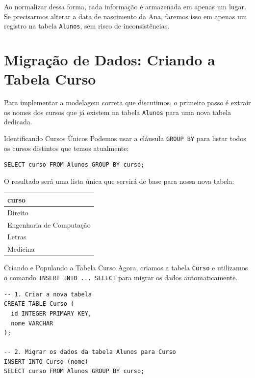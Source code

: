 \documentclass[12pt]{article}
\begin{document}
\begin{atencao}
Ao normalizar dessa forma, cada informação é armazenada em apenas um lugar. Se precisarmos alterar a data de nascimento da Ana, faremos isso em apenas um registro na tabela \texttt{Alunos}, sem risco de inconsistências.
\end{atencao}
\section{Migração de Dados: Criando a Tabela Curso}

Para implementar a modelagem correta que discutimos, o primeiro passo é extrair os nomes dos cursos que já existem na tabela \texttt{Alunos} para uma nova tabela dedicada.

\begin{block}{Identificando Cursos Únicos}
Podemos usar a cláusula \texttt{GROUP BY} para listar todos os cursos distintos que temos atualmente:

\begin{lstlisting}
SELECT curso FROM Alunos GROUP BY curso;
\end{lstlisting}

O resultado será uma lista única que servirá de base para nossa nova tabela:

\begin{center}
{\tiny
\begin{tabular}{|l|}
\hline
\textbf{curso} \\ \hline
Direito \\ \hline
Engenharia de Computação \\ \hline
Letras \\ \hline
Medicina \\ \hline
\end{tabular}
}
\end{center}
\end{block}

\begin{block}{Criando e Populando a Tabela Curso}
Agora, criamos a tabela \texttt{Curso} e utilizamos o comando \texttt{INSERT INTO ... SELECT} para migrar os dados automaticamente.

\begin{lstlisting}
-- 1. Criar a nova tabela
CREATE TABLE Curso (
  id INTEGER PRIMARY KEY,
  nome VARCHAR
);

-- 2. Migrar os dados da tabela Alunos para Curso
INSERT INTO Curso (nome)
SELECT curso FROM Alunos GROUP BY curso;
\end{lstlisting}
\end{block}
\end{document}
